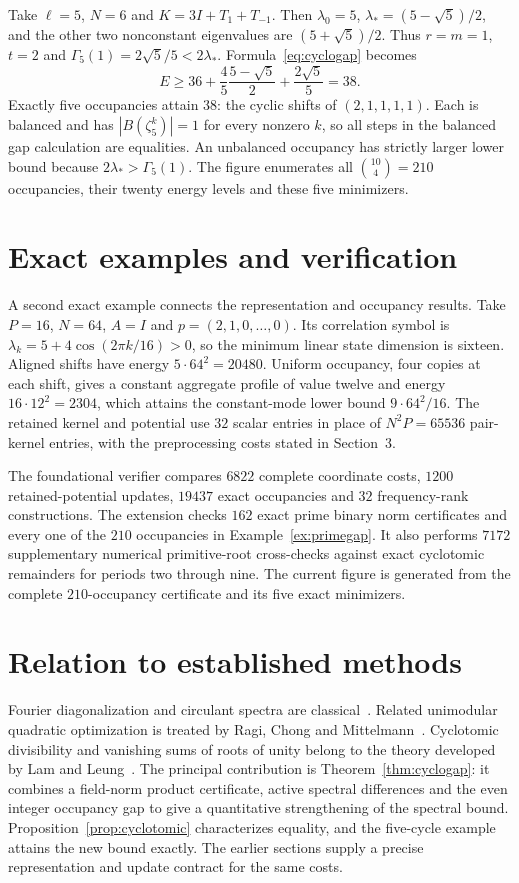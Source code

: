 \documentclass[11pt,a4paper]{article}
\begin{document}
\begin{example}\label{ex:primegap}
Take $\ell=5$, $N=6$ and $K=3I+T_1+T_{-1}$.
Then $\lambda_0=5$,
$\lambda_*=(5-\sqrt5)/2$, and the other two nonconstant eigenvalues are
$(5+\sqrt5)/2$. Thus $r=m=1$, $t=2$ and
$\Gamma_5(1)=2\sqrt5/5<2\lambda_*$. Formula~\eqref{eq:cyclogap} becomes
\[
 E\ge36+\frac{4}{5}\frac{5-\sqrt5}{2}
       +\frac{2\sqrt5}{5}=38.
\]
Exactly five occupancies attain $38$: the cyclic shifts of
$(2,1,1,1,1)$. Each is balanced and has $|B(\zeta_5^k)|=1$ for every
nonzero $k$, so all steps in the balanced gap calculation are equalities.
An unbalanced occupancy has strictly larger lower bound because
$2\lambda_*>\Gamma_5(1)$. The figure enumerates all
$\binom{10}{4}=210$ occupancies, their twenty energy levels and these five
minimizers.
\end{example}


\section{Exact examples and verification}
A second exact example connects the representation and occupancy results.
Take $P=16$, $N=64$, $A=I$ and $p=(2,1,0,\ldots,0)$. Its correlation
symbol is $\lambda_k=5+4\cos(2\pi k/16)>0$, so the minimum linear state
dimension is sixteen. Aligned shifts have energy $5\cdot64^2=20480$.
Uniform occupancy, four copies at each shift, gives a constant aggregate
profile of value twelve and energy $16\cdot12^2=2304$, which attains the
constant-mode lower bound $9\cdot64^2/16$. The retained kernel and
potential use $32$ scalar entries in place of $N^2P=65536$ pair-kernel
entries, with the preprocessing costs stated in Section~3.

The foundational verifier compares $6822$ complete coordinate costs,
$1200$ retained-potential updates, $19437$ exact occupancies and $32$
frequency-rank constructions. The extension checks $162$ exact prime
binary norm certificates and every one of the $210$ occupancies in
Example~\ref{ex:primegap}. It also performs $7172$ supplementary numerical
primitive-root cross-checks against exact cyclotomic remainders for periods
two through nine. The current figure is generated from the complete
$210$-occupancy certificate and its five exact minimizers.

\section{Relation to established methods}
Fourier diagonalization and circulant spectra are classical~\cite{gray}.
Related unimodular quadratic optimization is treated by Ragi, Chong and
Mittelmann~\cite{ragi}. Cyclotomic divisibility and vanishing sums of roots
of unity belong to the theory developed by Lam and Leung~\cite{lamleung}.
The principal contribution is Theorem~\ref{thm:cyclogap}: it combines a
field-norm product certificate, active spectral differences and the even
integer occupancy gap to give a quantitative strengthening of the spectral
bound. Proposition~\ref{prop:cyclotomic} characterizes equality, and the
five-cycle example attains the new bound exactly. The earlier sections
supply a precise representation and update contract for the same costs.
\end{document}
